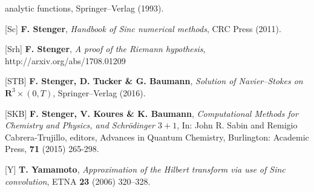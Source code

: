 \documentclass[11pt]{article}
\begin{document}
\begin{description}
\begin{sloppypar}
{   analytic functions}, Springer--Verlag (1993).
\item{[Sc]} {\bf F. Stenger}, {\em Handbook of Sinc numerical methods},
  CRC Press (2011).
\item{[Srh]} {\bf F. Stenger}, {\em A proof of the Riemann
  hypothesis}, \\ http://arxiv.org/abs/1708.01209
\item{[STB]} {\bf F. Stenger, D. Tucker \& G. Baumann},  {\em Solution of
  Navier--Stokes on ${\mathbf R}^3 \times (0,T)$}, Springer--Verlag (2016).
\item{[SKB]} {\bf F. Stenger, V. Koures \& K. Baumann}, {\em Computational
    Methods for Chemistry and Physics, and Schr\"odinger $3 + 1$}, In:
  John R. Sabin and Remigio Cabrera-Trujillo, editors, Advances in
  Quantum Chemistry, Burlington: Academic Press, {\bf 71} (2015)
  265-298.
\item{[Y]} {\bf T. Yamamoto}, {\em Approximation of the Hilbert transform
   via use of Sinc convolution}, ETNA  {\bf 23} (2006) 320--328. 
  \end{sloppypar}
\end{description}
\end{document}
